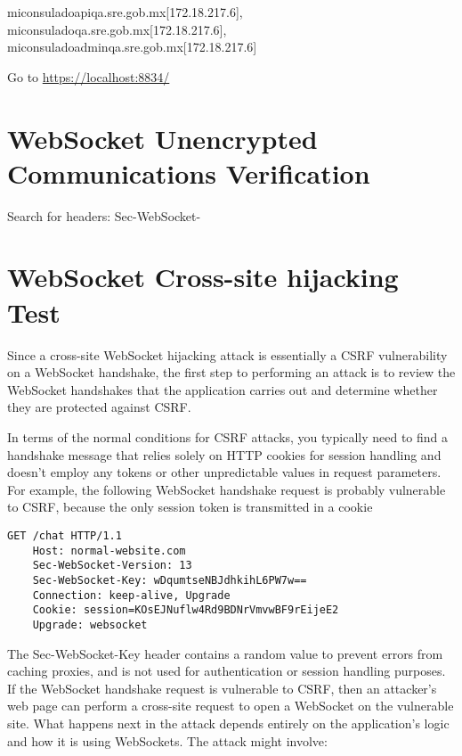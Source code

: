 miconsuladoapiqa.sre.gob.mx[172.18.217.6], miconsuladoqa.sre.gob.mx[172.18.217.6], miconsuladoadminqa.sre.gob.mx[172.18.217.6]



Go to \url{https://localhost:8834/}


\section{WebSocket Unencrypted Communications Verification}

Search for headers: Sec-WebSocket-

\section{WebSocket Cross-site hijacking Test}

Since a cross-site WebSocket hijacking attack is essentially a CSRF vulnerability on a WebSocket handshake, the first step to performing an attack is to review the WebSocket handshakes that the application carries out and determine whether they are protected against CSRF.

In terms of the normal conditions for CSRF attacks, you typically need to find a handshake message that relies solely on HTTP cookies for session handling and doesn't employ any tokens or other unpredictable values in request parameters.
For example, the following WebSocket handshake request is probably vulnerable to CSRF, because the only session token is transmitted in a cookie


\begin{lstlisting}[numbers=none]
	GET /chat HTTP/1.1
	Host: normal-website.com
	Sec-WebSocket-Version: 13
	Sec-WebSocket-Key: wDqumtseNBJdhkihL6PW7w==
	Connection: keep-alive, Upgrade
	Cookie: session=KOsEJNuflw4Rd9BDNrVmvwBF9rEijeE2
	Upgrade: websocket
\end{lstlisting}

\begin{fullwidth} %
The Sec-WebSocket-Key header contains a random value to prevent errors from caching proxies, and is not used for authentication or session handling purposes.
If the WebSocket handshake request is vulnerable to CSRF, then an attacker's web page can perform a cross-site request to open a WebSocket on the vulnerable site. What happens next in the attack depends entirely on the application's logic and how it is using WebSockets. The attack might involve:
\end{fullwidth}

